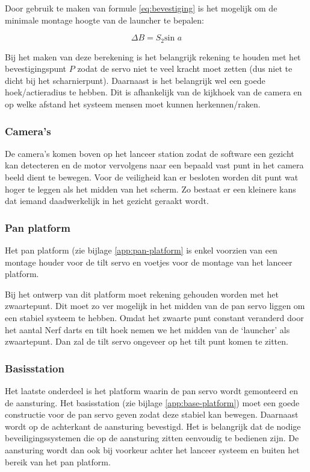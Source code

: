 Door gebruik te maken van formule \ref{eq:bevestiging} is het mogelijk om de minimale
montage hoogte van de launcher te bepalen:

\begin{equation}
    \Delta{B} = S_2 \text{sin } a
\end{equation}

Bij het maken van deze berekening is het belangrijk rekening te houden met het
bevestigingspunt $P$ zodat de servo niet te veel kracht moet zetten (dus niet
te dicht bij het scharnierpunt). Daarnaast is het belangrijk wel een goede
hoek/actieradius te hebben. Dit is afhankelijk van de kijkhoek van de
camera en op welke afstand het systeem mensen moet kunnen herkennen/raken.

\subsubsection{Camera's}

De camera’s komen boven op het lanceer station zodat de software een gezicht
kan detecteren en de motor vervolgens naar een bepaald vast punt in het camera
beeld dient te bewegen. Voor de veiligheid kan er besloten worden dit punt wat
hoger te leggen als het midden van het scherm. Zo bestaat er een kleinere kans
dat iemand daadwerkelijk in het gezicht geraakt wordt.

\subsubsection{Pan platform}

Het pan platform (zie bijlage \ref{app:pan-platform} is enkel voorzien van een
montage houder voor de tilt servo en voetjes voor de montage van het lanceer
platform.

Bij het ontwerp van dit platform moet rekening gehouden worden met het
zwaartepunt. Dit moet zo ver mogelijk in het midden van de pan servo liggen om
een stabiel systeem te hebben. Omdat het zwaarte punt constant veranderd door
het aantal Nerf darts en tilt hoek nemen we het midden van de ‘launcher’ als
zwaartepunt. Dan zal de tilt servo ongeveer op het tilt punt komen te zitten.

\subsubsection{Basisstation}

Het laatste onderdeel is het platform waarin de pan servo wordt gemonteerd en de
aansturing. Het basisstation (zie bijlage \ref{app:base-platform}) moet een
goede constructie voor de pan servo geven zodat deze stabiel kan bewegen.
Daarnaast wordt op de achterkant de aansturing bevestigd. Het is belangrijk dat
de nodige beveiligingssystemen die op de aansturing zitten eenvoudig te bedienen
zijn. De aansturing wordt dan ook bij voorkeur achter het lanceer systeem en
buiten het bereik van het pan platform.
